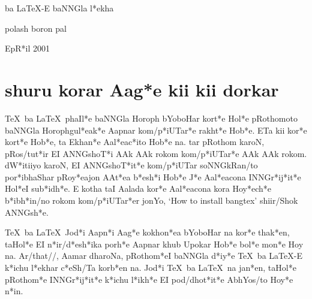 \documentclass[12pt]{barticle}
\def\tex{{\rm\TeX}}
\def\latex{{\rm\LaTeX}}
\begin{document}
\bng
\begin{titlepage}
\begin{center}

{\Lbng {\Large \tex} ba {\Large \latex}-E  baNNGla \*l*ekha}

\vfill

{\lbng polash boron pal}

\vfill\vfill

E\*pR*il 2001

\end{center}
\end{titlepage}
\setcounter{page}{2}


\tableofcontents

\newpage

\section{shuru korar Aa\*g*e kii kii dorkar}
\tex\ ba \latex\ phaI\*l*e baNNGla Horoph bYoboHar kor\*t*e Ho\*l*e
pRothomoto baNNGla Horophgu\*l*ea\*k*e Aapnar ko\*m/p*iUTa\*r*e
rakh\*t*e Ho\*b*e. ETa kii ko\*r*e kor\*t*e Ho\*b*e, ta Ekha\*n*e
Aa\*l*ea\*c*ito Ho\*b*e na. tar pRothom karoN, pRos/tu\*t*ir EI
ANNGsho\*T*i AAk AAk rokom ko\*m/p*iUTa\*r*e AAk AAk
rokom. \*dW*itiiyo karoN, EI ANNGsho\*T*i\*t*e ko\*m/p*iUTar
soNNGkRan/to po\*r*ibhaShar pRo\*y*eajon AA\*t*ea \*b*e\*sh*i Ho\*b*e
\*J*e Aa\*l*eacona INNG\*r*i\*j*i\*t*e Ho\*l*eI su\*b*i\*dh*e. E kotha
taI Aalada ko\*r*e Aa\*l*eacona kora Ho\*y*e\*ch*e \*b*i\*bh*in/no
rokom ko\*m/p*iUTa\*r*er jonYo, {\rm `How to install bangtex'}
shiir/Shok ANNG\*sh*e.

\tex\ ba \latex\ Jo\*d*i Aap\*n*i Aa\*g*e kokho\*n*ea bYoboHar na
ko\*r*e tha\*k*en, taHo\*l*e EI \*n*i\*r/d*e\*sh*ika po\*rh*e Aapnar
khub Upokar Ho\*b*e bo\*l*e mo\*n*e Hoy na. Ar/that//, Aamar dharoNa,
pRotho\*m*eI baNNGla \*d*i\*y*e \tex\ ba \latex-E \*k*ichu \*l*ekhar
\*c*eSh/Ta kor\*b*en na. Jo\*d*i \tex\ ba \latex\ na ja\*n*en,
taHo\*l*e pRotho\*m*e INNG\*r*i\*j*i\*t*e \*k*ichu \*l*i\*kh*e EI
pod/dho\*t*i\*t*e AbhYos/to Ho\*y*e \*n*in.


\end{document}
